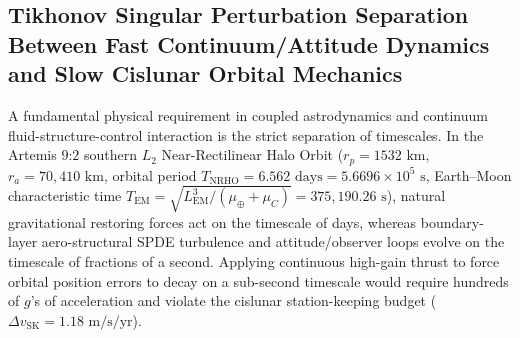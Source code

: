 \documentclass[11pt,a4paper,reqno]{article}
\def\mathbb#1{#1}%
\theoremstyle{plain}
\theoremstyle{definition}
\theoremstyle{remark}
\numberwithin{equation}{section}
\begin{document}
\subsection{Tikhonov Singular Perturbation Separation Between Fast Continuum/Attitude Dynamics and Slow Cislunar Orbital Mechanics}
A fundamental physical requirement in coupled astrodynamics and continuum fluid-structure-control interaction is the strict separation of timescales. In the Artemis $9\text{:}2$ southern $L_2$ Near-Rectilinear Halo Orbit ($r_p = 1532\text{ km}$, $r_a = 70,410\text{ km}$, orbital period $T_{\text{NRHO}} = 6.562\text{ days} = 5.6696 \times 10^5\text{ s}$, Earth--Moon characteristic time $T_{\text{EM}} = \sqrt{L_{\text{EM}}^3 / (\mu_\oplus + \mu_{\mathbb{C}})} = 375,190.26\text{ s}$), natural gravitational restoring forces act on the timescale of days, whereas boundary-layer aero-structural SPDE turbulence and attitude/observer loops evolve on the timescale of fractions of a second. Applying continuous high-gain thrust to force orbital position errors to decay on a sub-second timescale would require hundreds of $g$'s of acceleration and violate the cislunar station-keeping budget ($\Delta v_{\text{SK}} = 1.18\text{ m/s/yr}$).
\end{document}
